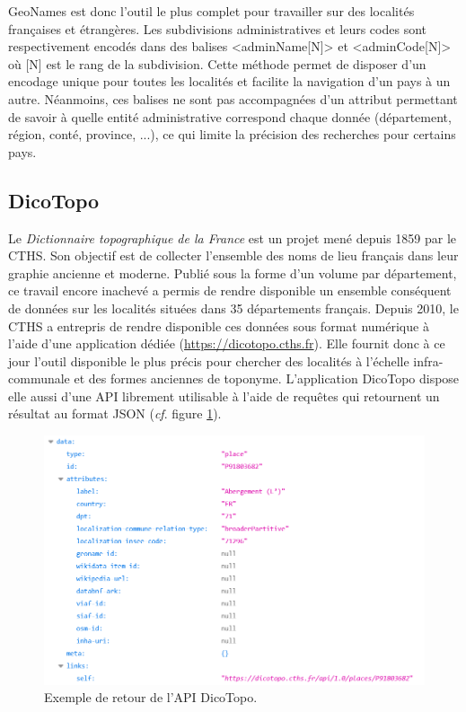 \documentclass[a4paper,12pt,twoside]{book}
\begin{document}
	
	GeoNames est donc l'outil le plus complet pour travailler sur des localités françaises et étrangères. Les subdivisions administratives et leurs codes sont respectivement encodés dans des balises <adminName[N]> et <adminCode[N]> où [N] est le rang de la subdivision. Cette méthode permet de disposer d'un encodage unique pour toutes les localités et facilite la navigation d'un pays à un autre. Néanmoins, ces balises ne sont pas accompagnées d'un attribut permettant de savoir à quelle entité administrative correspond chaque donnée (département, région, conté, province, ...), ce qui limite la précision des recherches pour certains pays.
	
	\subsection{DicoTopo}
	
	Le \textit{Dictionnaire topographique de la France} est un projet mené depuis 1859 par le CTHS. Son objectif est de collecter l'ensemble des noms de lieu français dans leur graphie ancienne et moderne. Publié sous la forme d'un volume par département, ce travail encore inachevé a permis de rendre disponible un ensemble conséquent de données sur les localités situées dans 35 départements français. Depuis 2010, le CTHS a entrepris de rendre disponible ces données sous format numérique à l'aide d'une application dédiée (\url{https://dicotopo.cths.fr}). Elle fournit donc à ce jour l'outil disponible le plus précis pour chercher des localités à l'échelle infra-communale et des formes anciennes de toponyme. L'application DicoTopo dispose elle aussi d'une API librement utilisable à l'aide de requêtes qui retournent un résultat au format JSON (\textit{cf}. figure \ref{API_dicotopo}).
	
	\begin{figure}
		\centering
		\includegraphics[width=\textwidth]{Images/Result_dicotopo.png}
		\caption{Exemple de retour de l'API DicoTopo.}
		\label{API_dicotopo}
	\end{figure}
	
\end{document}
